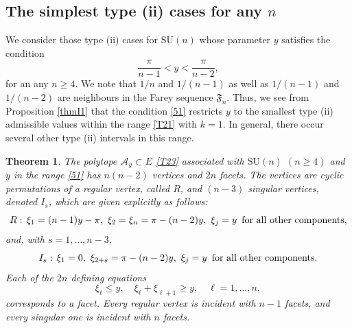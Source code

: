 \documentclass[a4paper,11pt,reqno]{amsart}
\newtheorem{thm}{Theorem}[section]
\theoremstyle{definition}
\numberwithin{equation}{section}
\newcommand{\be}{\begin{equation}}
\newcommand{\ee}{\end{equation}}
\def\cA{{\mathcal A}}                       %
\def\SU{\mathrm{SU}}                        %
\def\fF{{\mathfrak F}}                      %
\begin{document}
\subsection{The simplest type (ii) cases for any $n$}\label{Sec51}
 We consider those type (ii) cases  for $\SU(n)$ whose parameter $y$ satisfies the condition
\be
 \frac{\pi}{n-1} < y < \frac{\pi}{n-2},
\label{51}\ee
for an any $n\geq 4$.
 We note that $1/n$ and $1/(n-1)$ as well as $1/(n-1)$ and $1/(n-2)$ are neighbours in the Farey sequence $\fF_n$.
Thus, we see from Proposition  \ref{thmI1} that the condition \eqref{51} restricts $y$ to the smallest type (ii) admissible values
 within the range \eqref{T21} with $k=1$.
 In general, there occur several other type (ii) intervals in this range.

\begin{thm}\label{thm51}
The polytope $\cA_y \subset E$ \eqref{T23} associated with $\SU(n)$ $(n\geq 4)$ and $y$ in the range \eqref{51} has $n(n-2)$ vertices and $2n$ facets.
The vertices are cyclic permutations of a regular vertex, called $R$, and $(n-3)$ singular vertices,
denoted $I_s$, which are given explicitly as follows:
\be
R:\, \xi_1=  (n-1)y - \pi,\,\, \xi_2 = \xi_n = \pi-(n-2)y,\,\,  \xi_j=y \,\,\, \hbox{for all other components},
\label{54}\ee
and,  with $s=1,\dots, n-3$,
\be
I_s:\, \xi_1=0,\, \,\xi_{2 + s} =\pi -(n-2) y,\,\, \xi_j=y \,\,\, \hbox{for all other components}.
\label{52}\ee
Each of the $2n$ defining equations
\be
\xi_\ell \leq y, \quad \xi_\ell + \xi_{\ell +1} \geq y,\quad  \ell=1,\dots, n,
\label{ineqs}\ee
corresponds to a facet.
 Every regular vertex is incident with $n-1$ facets, and every  singular one is incident with $n$ facets.
 \end{thm}
\end{document}
